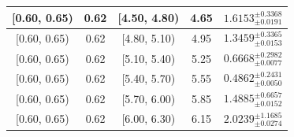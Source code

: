 \begin{longtable}{|c|c|c|c|c|}
\hline
[0.60, 0.65) & 0.62 & [4.50, 4.80) & 4.65 & $1.6153^{ \pm 0.3368 }_{ \pm 0.0191 }$ \\ 
\hline
[0.60, 0.65) & 0.62 & [4.80, 5.10) & 4.95 & $1.3459^{ \pm 0.3365 }_{ \pm 0.0153 }$ \\ 
\hline
[0.60, 0.65) & 0.62 & [5.10, 5.40) & 5.25 & $0.6668^{ \pm 0.2982 }_{ \pm 0.0077 }$ \\ 
\hline
[0.60, 0.65) & 0.62 & [5.40, 5.70) & 5.55 & $0.4862^{ \pm 0.2431 }_{ \pm 0.0050 }$ \\ 
\hline
[0.60, 0.65) & 0.62 & [5.70, 6.00) & 5.85 & $1.4885^{ \pm 0.6657 }_{ \pm 0.0152 }$ \\ 
\hline
[0.60, 0.65) & 0.62 & [6.00, 6.30) & 6.15 & $2.0239^{ \pm 1.1685 }_{ \pm 0.0274 }$ \\ 
\hline
\end{longtable}
\endgroup
